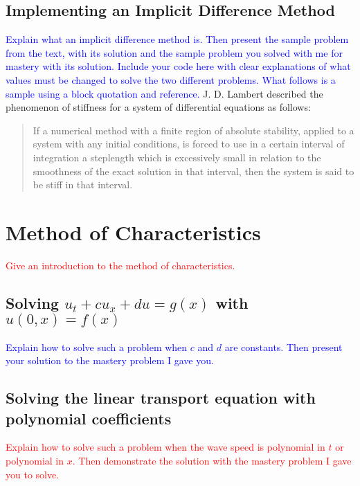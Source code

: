 \documentclass{article}
\newcommand{\red}[1]{\textcolor{red}{#1}}
\newcommand{\blue}[1]{\textcolor{blue}{#1}}
\begin{document}
\subsection{Implementing an Implicit Difference Method}
\blue{Explain what an implicit difference method is. Then present the sample problem from the text, with its solution and the sample problem you solved with me for mastery with its solution. Include your code here with clear explanations of what values must be changed to solve the two different problems. What follows is a sample using a block quotation and reference.}
J. D. Lambert described the phenomenon of stiffness for a system of
differential equations as follows:
\begin{quote} If a numerical method with a finite region of absolute stability,
    applied to a system with any initial conditions, is forced to use in a
    certain interval of integration a steplength which is excessively small in
    relation to the smoothness of the exact solution in that interval, then the
    system is said to be stiff in that interval. \cite{wikistiff}
    \end{quote}
\section{Method of Characteristics}
\red{Give an introduction to the method of characteristics.}
\subsection{Solving $u_t+cu_x +du = g(x)$ with $u(0,x)=f(x)$}
\blue{Explain how to solve such a problem when $c$ and $d$ are constants. Then present your solution to the mastery problem I gave you.}
\subsection{Solving the linear transport equation with polynomial coefficients}
\red{Explain how to solve such a problem when the wave speed is polynomial in $t$ or polynomial in $x$. Then demonstrate the solution with the mastery problem I gave you to solve.}
\end{document}
